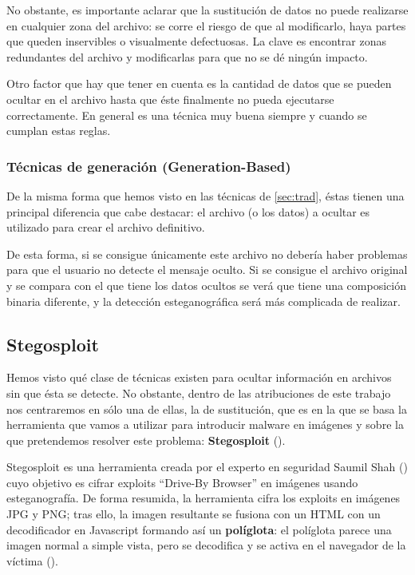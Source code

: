 No obstante, es importante aclarar que la sustitución de datos no puede realizarse en cualquier zona del archivo: se corre el riesgo de que al modificarlo, haya partes que queden inservibles o visualmente defectuosas. La clave es encontrar zonas redundantes del archivo y modificarlas para que no se dé ningún impacto.

Otro factor que hay que tener en cuenta es la cantidad de datos que se pueden ocultar en el archivo hasta que éste finalmente no pueda ejecutarse correctamente. En general es una técnica muy buena siempre y cuando se cumplan estas reglas.

\subsubsection{Técnicas de generación (Generation-Based)}

De la misma forma que hemos visto en las técnicas de \ref{sec:trad}, éstas tienen una principal diferencia que cabe destacar: el archivo (o los datos) a ocultar es utilizado para crear el archivo definitivo.

De esta forma, si se consigue únicamente este archivo no debería haber problemas para que el usuario no detecte el mensaje oculto. Si se consigue el archivo original y se compara con el que tiene los datos ocultos se verá que tiene una composición binaria diferente, y la detección esteganográfica será más complicada de realizar.

\subsection{Stegosploit}

Hemos visto qué clase de técnicas existen para ocultar información en archivos sin que ésta se detecte. No obstante, dentro de las atribuciones de este trabajo nos centraremos en sólo una de ellas, la de sustitución, que es en la que se basa la herramienta que vamos a utilizar para introducir malware en imágenes y sobre la que pretendemos resolver este problema: \textbf{Stegosploit} (\cite{stegosploit}). %

Stegosploit es una herramienta creada por el experto en seguridad Saumil Shah (\cite{saumil-shah}) cuyo objetivo es cifrar exploits ``Drive-By Browser'' en imágenes usando esteganografía. De forma resumida, la herramienta cifra los exploits en imágenes JPG y PNG; tras ello, la imagen resultante se fusiona con un HTML con un decodificador en Javascript formando así un \textbf{políglota}: el políglota parece una imagen normal a simple vista, pero se decodifica y se activa en el navegador de la víctima (\cite{stegosploit}). %

